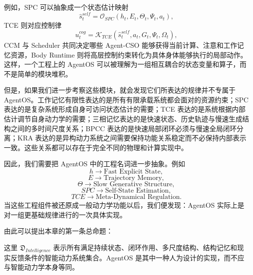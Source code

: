 例如，SPC 可以抽象成一个状态估计映射
\begin{equation}
\widehat{s}^{self}_{t}
=
\mathcal{O}_{SPC}
\left(
h_t,E_t,\Theta_t,\Psi_t,a_t
\right),
\end{equation}
TCE 则对应控制律
\begin{equation}
u^{cog}_{t}
=
\mathcal{K}_{TCE}
\left(
\widehat{s}^{self}_{t},
a_t,
G_t,
\Psi_t,
\Omega_t
\right),
\end{equation}
CCM 与 Scheduler 共同决定哪些 Agent-CSO 能够获得当前计算、注意和工作记忆资源，Body Runtime 则将高层控制约束转化为具体身体能够执行的局部动作。这样，一个工程上的 AgentOS 可以被理解为一组相互耦合的状态变量和算子，而不是简单的模块堆积。

但是，如果我们进一步考察这些模块，就会发现它们所表达的规律并不专属于 AgentOS。工作记忆有限性表达的是所有有限承载系统都会面对的资源约束；SPC 表达的是复杂系统形成自身可访问状态估计的需要；TCE 表达的是系统根据内部估计调节自身动力学的需要；三相记忆表达的是快速状态、历史轨迹与慢速生成结构之间的多时间尺度关系；BPCC 表达的是快速局部闭环必须与慢速全局闭环分离；KRA 表达的是异构动力系统之间需要保持功能关系稳定而不必保持内部表示一致。这些关系都可以存在于完全不同的物理和计算实现中。

因此，我们需要把 AgentOS 中的工程名词进一步抽象。例如
\begin{equation}
h
\longrightarrow
\text{Fast Explicit State},
\end{equation}
\begin{equation}
E
\longrightarrow
\text{Trajectory Memory},
\end{equation}
\begin{equation}
\Theta
\longrightarrow
\text{Slow Generative Structure},
\end{equation}
\begin{equation}
SPC
\longrightarrow
\text{Self-State Estimation},
\end{equation}
\begin{equation}
TCE
\longrightarrow
\text{Meta-Dynamical Regulation}.
\end{equation}
当这些工程组件被还原成一般动力学功能以后，我们便发现：AgentOS 实际上是对一组更基础规律进行的一次具体实现。

由此可以提出本章的第一条总命题：
\begin{statementbox}
\centering
{}
\end{statementbox}
这里 $\mathfrak{D}_{Intelligence}$ 表示所有满足持续状态、闭环作用、多尺度结构、结构记忆和现实反馈条件的智能动力系统集合。AgentOS 是其中一种人为设计的实现，而不应与智能动力学本身等同。

